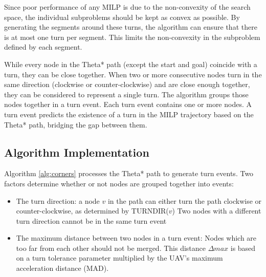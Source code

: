 \par
Since poor performance of any MILP is due to the non-convexity of the search space, the individual subproblems should be kept as convex as possible. By generating the segments around these turns, the algorithm can ensure that there is at most one turn per segment. This limits the non-convexity in the subproblem defined by each segment.
\par
While every node in the Theta* path (except the start and goal) coincide with a turn, they can be close together. When two or more consecutive nodes turn in the same direction (clockwise or counter-clockwise) and are close enough together, they can be considered to represent a single turn. The algorithm groups those nodes together in a turn event. Each turn event contains one or more nodes. A turn event predicts the existence of a turn in the MILP trajectory based on the   Theta* path, bridging the gap between them.

\subsection{Algorithm Implementation}
Algorithm \ref{alg:corners} processes the Theta* path to generate turn events. Two factors determine whether or not nodes are grouped together into events:
\begin{itemize}
\item The turn direction: a node $v$ in the path can either turn the path clockwise or counter-clockwise, as determined by TURNDIR($v$) Two nodes with a different turn direction cannot be in the same turn event
\item The maximum distance between two nodes in a turn event: Nodes which are too far from each other should not be merged. This distance $\Delta max$ is based on a turn tolerance parameter multiplied by the UAV's maximum acceleration distance (MAD). 
\end{itemize}



